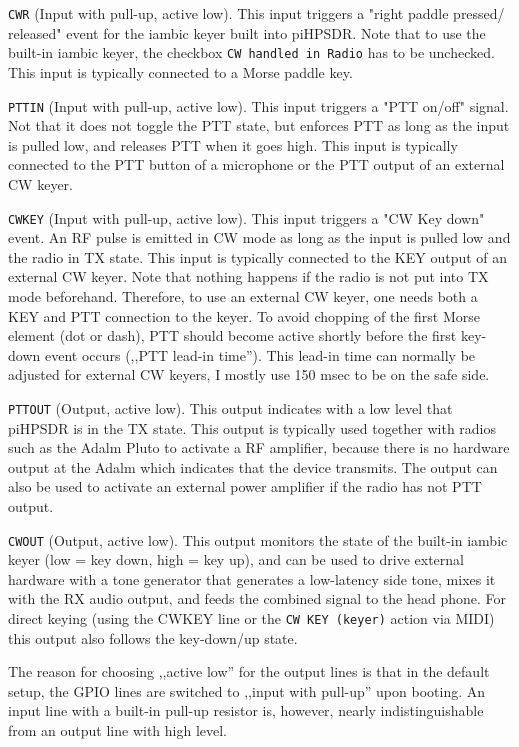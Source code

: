\documentclass[12pt]{book}
\def\rett#1{\texttt{\color{red}#1}}
\def\bltt#1{\texttt{\color{blue}#1}}
\def\pH{pi\-HPSDR\xspace}
\begin{document}
\rett{CWR} (Input with pull-up, active low). This input triggers a "right paddle pressed/
released" event for the
iambic keyer built into \pH. Note that to use the built-in iambic keyer, the checkbox
\bltt{CW handled in Radio} has to be unchecked. This input is typically connected to
a Morse paddle key.


\rett{PTTIN} (Input with pull-up, active low). This input triggers a "PTT on/off" signal.
Not that it does not toggle the PTT state, but enforces PTT as long as the input is pulled low,
and releases PTT when it goes high. This input is typically connected to the PTT button of
a microphone or the PTT output of an external CW keyer.

\rett{CWKEY} (Input with pull-up, active low). This input triggers a "CW Key down" event. An
RF pulse is emitted in CW mode as long as the input is pulled low and the radio in TX state.
This input is typically connected to the KEY output of an external CW keyer.  Note that  nothing
happens if the radio is not put into TX mode beforehand. Therefore, to use an external CW keyer,
one needs both a KEY and PTT connection to the keyer. To avoid chopping of the first Morse element
(dot or dash), PTT should become active shortly before the first key-down event occurs (,,PTT
lead-in time''). This lead-in time can normally be adjusted for external CW keyers, I mostly use
150 msec to be on the safe side.

\rett{PTTOUT} (Output, active low). This output indicates with a low level that \pH is in the
TX state. This output is typically used together with radios such as the Adalm Pluto to activate
a RF amplifier, because there is no hardware output at the Adalm which indicates that the device
transmits. The output can also be used to activate an external power amplifier if the radio has
not PTT output.

\rett{CWOUT} (Output, active low). This output monitors the state of the built-in iambic keyer
(low = key down, high = key up), and can be used to drive external hardware with a tone generator
that generates a low-latency side tone, mixes it with the RX audio output, and feeds the combined
signal to the head phone. For direct keying (using the CWKEY line or the \bltt{CW KEY (keyer)}
action via MIDI) this output also
follows the key-down/up state.

The reason for choosing ,,active low'' for the output lines is that in the default setup,
the GPIO lines are switched
to ,,input with pull-up'' upon booting. An input line with a built-in pull-up
resistor is, however,
nearly indistinguishable from an output line with high level.
\end{document}
